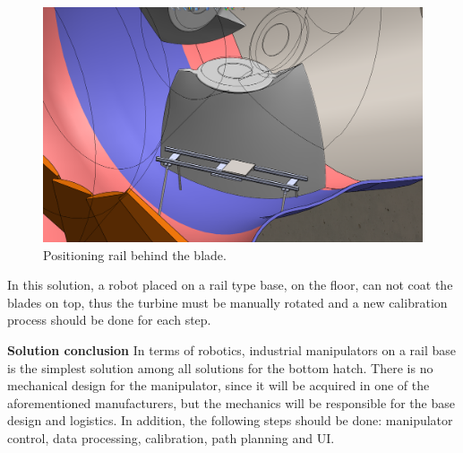 \begin{figure}[h!]	
	\includegraphics[width=\columnwidth]{figs/manipuladores/rail2.PNG}
	\caption{Positioning rail behind the blade.}
	\label{fig::rail2}
\end{figure}

In this solution, a robot placed on a rail type base, on the floor, can not coat
the blades on top, thus the turbine must be manually rotated and a new
calibration process should be done for each step.


\textbf{Solution conclusion}
In terms of robotics, industrial manipulators on a rail base is the simplest
solution among all solutions for the bottom hatch. There is no
mechanical design for the manipulator, since it will be acquired in one of the
aforementioned manufacturers, but the mechanics will be responsible for the base
design and logistics. In addition, the following steps should be done:
manipulator control, data processing, calibration, path planning and UI.

